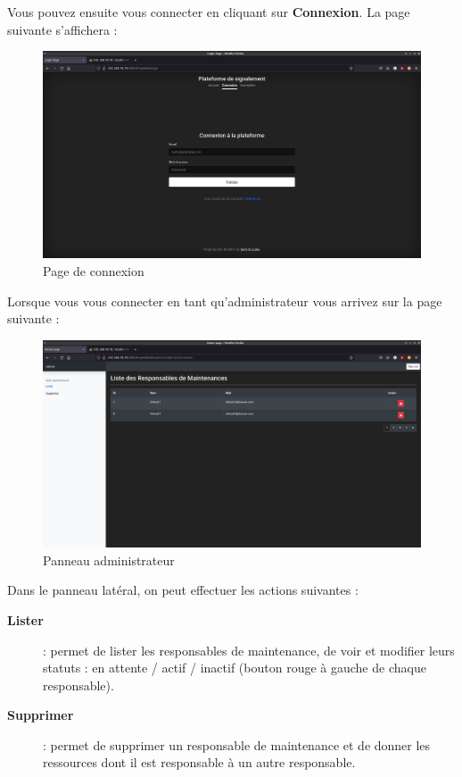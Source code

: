 Vous pouvez ensuite vous connecter en cliquant sur \textbf{Connexion}. La page suivante
s'affichera :
\begin{figure}[!h]
    \centering
    \includegraphics[width=15cm]{img/sign-in.png}
    \caption{Page de connexion}
\end{figure}
\newpage

Lorsque vous vous connecter en tant qu'administrateur vous arrivez sur la page suivante :
\begin{figure}[!h]
    \centering
    \includegraphics[width=\textwidth]{img/admin.png}
    \caption{Panneau administrateur}
\end{figure}

Dans le panneau latéral, on peut effectuer les actions suivantes :
\begin{description}
    \item[\textbf{Lister}] : permet de lister les responsables de maintenance, de voir et modifier
        leurs statuts : en attente / actif / inactif (bouton rouge à gauche de chaque responsable).
    \item[\textbf{Supprimer}] : permet de supprimer un responsable de maintenance et de donner les
        ressources dont il est responsable à un autre responsable.
\end{description}
\newpage

